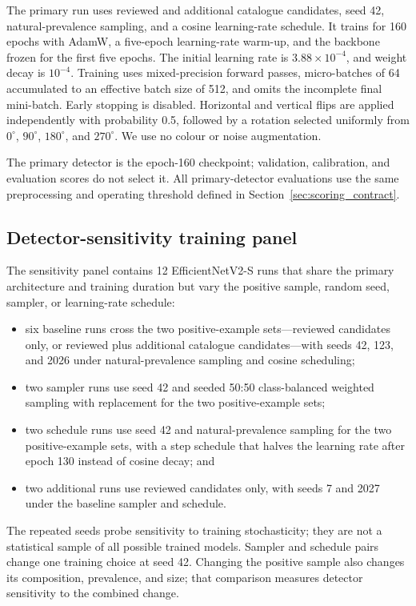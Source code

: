 The primary run uses reviewed and additional catalogue candidates, seed 42,
natural-prevalence sampling, and a cosine learning-rate schedule. It trains
for 160 epochs with AdamW, a five-epoch learning-rate warm-up, and the
backbone frozen for the first five epochs. The initial learning rate is
\(3.88\times10^{-4}\), and weight decay is \(10^{-4}\). Training uses
mixed-precision forward passes, micro-batches of 64 accumulated to an
effective batch size of 512, and omits the incomplete final mini-batch. Early
stopping is disabled.
Horizontal and vertical flips are applied independently with probability 0.5,
followed by a rotation selected uniformly from $0^\circ$, $90^\circ$,
$180^\circ$, and $270^\circ$. We use no colour or noise augmentation.

The primary detector is the epoch-160 checkpoint; validation, calibration,
and evaluation scores do not select it. All primary-detector evaluations use the same
preprocessing and operating threshold defined in
Section~\ref{sec:scoring_contract}.

\subsection{Detector-sensitivity training panel}
\label{sec:checkpoint_panel_design}

The sensitivity panel contains 12 EfficientNetV2-S runs that share the
primary architecture and training duration but vary the positive sample,
random seed, sampler, or learning-rate schedule:
\begin{itemize}
\item six baseline runs cross the two positive-example sets---reviewed
candidates only, or reviewed plus additional catalogue candidates---with
seeds 42, 123, and 2026 under natural-prevalence sampling and cosine
scheduling;
\item two sampler runs use seed 42 and seeded 50:50 class-balanced
weighted sampling with replacement for the two positive-example sets;
\item two schedule runs use seed 42 and natural-prevalence sampling for the
two positive-example sets, with a step schedule that halves the learning rate after epoch
130 instead of cosine decay; and
\item two additional runs use reviewed candidates only, with seeds 7 and 2027
under the baseline sampler and schedule.
\end{itemize}
The repeated seeds probe sensitivity to training stochasticity; they are not a
statistical sample of all possible trained models. Sampler and schedule pairs
change one training choice at seed 42. Changing the positive sample also
changes its composition, prevalence, and size; that comparison measures
detector sensitivity to the combined change.

